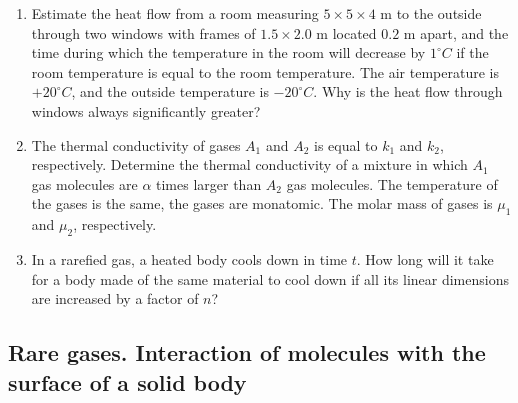 \documentclass{article}
\begin{document}
\begin{enumerate}[label=5.3.\arabic*]
\item Estimate the heat flow from a room measuring $5 \times 5 \times 4$ m to the outside through two windows with frames of $1.5 \times 2.0$ m located $0.2$ m apart, and the time during which the temperature in the room will decrease by $1^\circ C$ if the room temperature is equal to the room temperature. The air temperature is $+20^\circ C$, and the outside temperature is $-20^\circ C$. Why is the heat flow through windows always significantly greater?

\item The thermal conductivity of gases $A_1$ and $A_2$ is equal to $k_1$ and $k_2$, respectively. Determine the thermal conductivity of a mixture in which $A_1$ gas molecules are $\alpha$ times larger than $A_2$ gas molecules. The temperature of the gases is the same, the gases are monatomic. The molar mass of gases is $\mu_1$ and $\mu_2$, respectively.

\item In a rarefied gas, a heated body cools down in time $t$. How long will it take for a body made of the same material to cool down if all its linear dimensions are increased by a factor of $n$?




\end{enumerate}

\subsection{Rare gases. Interaction of molecules with the surface of a solid body}
\end{document}
